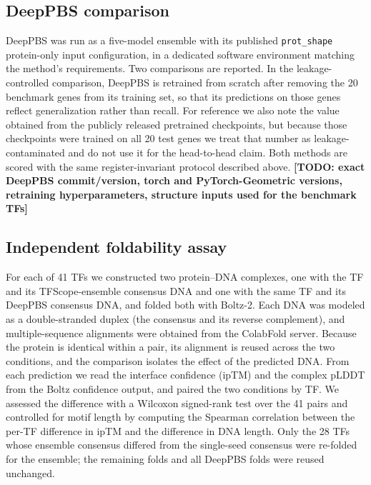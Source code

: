 \documentclass[11pt]{article}
\newcommand{\TODO}[1]{{\color{red}\textbf{[TODO: #1]}}}
\begin{document}
\subsection*{DeepPBS comparison}
DeepPBS\cite{mitra2024deeppbs} was run as a five-model ensemble with its published
\texttt{prot\_shape} protein-only input configuration, in a dedicated software
environment matching the method's requirements. Two comparisons are reported. In the
leakage-controlled comparison, DeepPBS is retrained from scratch after removing the 20
benchmark genes from its training set, so that its predictions on those genes reflect
generalization rather than recall. For reference we also note the value obtained from
the publicly released pretrained checkpoints, but because those checkpoints were trained
on all 20 test genes we treat that number as leakage-contaminated and do not use it for
the head-to-head claim. Both methods are scored with the same register-invariant
protocol described above.
\TODO{exact DeepPBS commit/version, torch and PyTorch-Geometric versions, retraining
hyperparameters, structure inputs used for the benchmark TFs}

\subsection*{Independent foldability assay}
For each of 41 TFs we constructed two protein--DNA complexes, one with the TF and its
TFScope-ensemble consensus DNA and one with the same TF and its DeepPBS consensus DNA,
and folded both with Boltz-2\cite{passaro2025boltz2,wohlwend2024boltz1}. Each DNA was modeled as a
double-stranded duplex (the consensus and its reverse complement), and multiple-sequence
alignments were obtained from the ColabFold server\cite{mirdita2022colabfold}. Because
the protein is identical within a pair, its alignment is reused across the two
conditions, and the comparison isolates the effect of the predicted DNA. From each
prediction we read the interface confidence (ipTM) and the complex pLDDT from the Boltz
confidence output, and paired the two conditions by TF. We assessed the difference with a
Wilcoxon signed-rank test over the 41 pairs and controlled for motif length by computing
the Spearman correlation between the per-TF difference in ipTM and the difference in DNA
length. Only the 28 TFs whose ensemble consensus differed from the single-seed consensus
were re-folded for the ensemble; the remaining folds and all DeepPBS folds were reused
unchanged.
\end{document}

